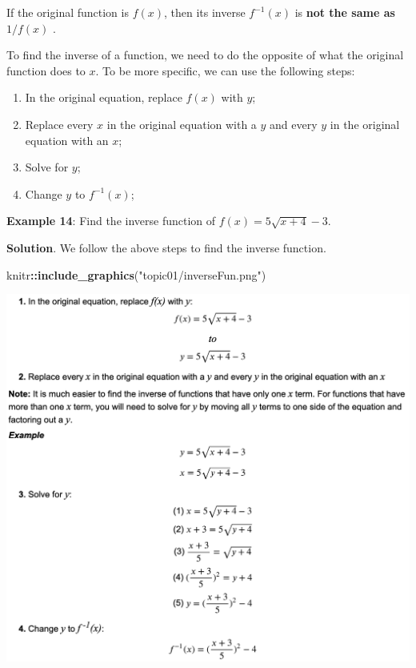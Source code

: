 \documentclass[
]{book}
\newenvironment{Shaded}{\begin{snugshade}}{\end{snugshade}}
\newcommand{\FunctionTok}[1]{\textcolor[rgb]{0.13,0.29,0.53}{\textbf{#1}}}
\newcommand{\NormalTok}[1]{#1}
\newcommand{\SpecialCharTok}[1]{\textcolor[rgb]{0.81,0.36,0.00}{\textbf{#1}}}
\newcommand{\StringTok}[1]{\textcolor[rgb]{0.31,0.60,0.02}{#1}}
\begin{document}
If the original function is \(f(x)\), then its inverse \(f^{-1}(x)\) is \textbf{not the same as} \(1/f(x)\) .

To find the inverse of a function, we need to do the opposite of what the original function does to \(x\). To be more specific, we can use the following steps:

\begin{enumerate}
\def\labelenumi{\arabic{enumi}.}
\item
  In the original equation, replace \(f(x)\) with \(y\);
\item
  Replace every \(x\) in the original equation with a \(y\) and every \(y\) in the original equation with an \(x\);
\item
  Solve for \(y\);
\item
  Change \(y\) to \(f^{-1}(x)\);
\end{enumerate}

\hfill\break

\textbf{Example 14}: Find the inverse function of \(f(x) = 5\sqrt{x+4}-3\).

\textbf{Solution}. We follow the above steps to find the inverse function.

\begin{Shaded}
\begin{Highlighting}[]
\NormalTok{knitr}\SpecialCharTok{::}\FunctionTok{include\_graphics}\NormalTok{(}\StringTok{"topic01/inverseFun.png"}\NormalTok{)}
\end{Highlighting}
\end{Shaded}

\begin{center}\includegraphics[width=0.8\linewidth]{topic01/inverseFun} \end{center}
\end{document}
